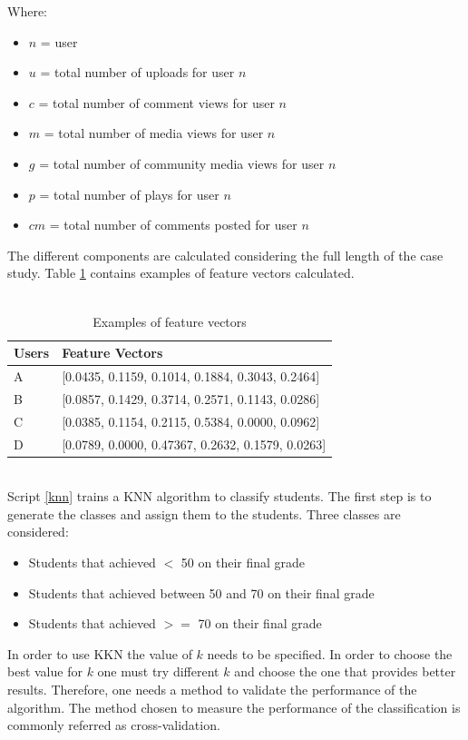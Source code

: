 \documentclass[11pt, oneside]{article}   	%
\begin{document}
Where:
\begin{itemize}
	\item $n$ = user
	\item $u$ = total number of uploads for user $n$
	\item $c$ = total number of comment views for user $n$
	\item $m$ = total number of media views for user $n$
	\item $g$ = total number of community media views for user $n$
	\item $p$ = total number of plays for user $n$
	\item $cm$ = total number of comments posted for user $n$
\end{itemize}
The different components are calculated considering the full length of the case study. Table \ref{table:featureVectorsKNN} contains examples of feature vectors calculated.\\\\
\begin{table}[h]
	\centering
	\begin{tabular}{| l | l |}
		\hline
		 \textbf{Users} & \textbf{Feature Vectors} \\ \hline
		 A & [0.0435, 0.1159, 0.1014, 0.1884, 0.3043, 0.2464] \\ \hline
		 B & [0.0857, 0.1429, 0.3714, 0.2571, 0.1143, 0.0286] \\ \hline
		 C & [0.0385, 0.1154, 0.2115, 0.5384, 0.0000, 0.0962] \\ \hline
		 D & [0.0789, 0.0000, 0.47367, 0.2632, 0.1579, 0.0263] \\ \hline
	\end{tabular}
	\caption{Examples of feature vectors}
	\label{table:featureVectorsKNN}
\end{table}
\\Script \ref{knn} trains a KNN algorithm to classify students. The first step is to generate the classes and assign them to the students. Three classes are considered:
\begin{itemize}
	\item Students that achieved $<$ 50 on their final grade
	\item Students that achieved between 50 and 70 on their final grade
	\item Students that achieved $>=$ 70 on their final grade
\end{itemize}
\vspace{5mm}
In order to use KKN the value of $k$ needs to be specified. In order to choose the best value for $k$ one must try different $k$ and choose the one that provides better results. Therefore, one needs a method to validate the performance of the algorithm. The method chosen to measure the performance of the classification is commonly referred as cross-validation.\\\\
\end{document}
